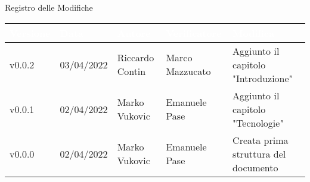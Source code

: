 \begin{center}
  \huge{Registro delle Modifiche}
\end{center}
\renewcommand\arraystretch{1,5}
{\centering
\begin{longtable}{|C{1.8cm}|C{2.1cm}|C{2cm}|C{2.4cm}|L{4.4cm}|}
  \hline
  \textcolor[HTML]{FFFFFF}{\textbf{Versione}} & \textcolor[HTML]{FFFFFF}{\textbf{Data}} & \textcolor[HTML]{FFFFFF}{\textbf{Autore}}  & \textcolor[HTML]{FFFFFF}{\textbf{Verificatore}} & \textcolor[HTML]{FFFFFF}{\textbf{Modifica}}    \\ \hline
  v0.0.2        & 03/04/2022    & Riccardo Contin   &   Marco Mazzucato   & Aggiunto il capitolo "Introduzione" \\ \hline
  v0.0.1        & 02/04/2022    & Marko Vukovic   & Emanuele Pase         & Aggiunto il capitolo "Tecnologie" \\ \hline
  v0.0.0        & 02/04/2022    & Marko Vukovic   & Emanuele Pase         & Creata prima struttura del documento \\ \hline
\end{longtable}}

\renewcommand\arraystretch{1}
